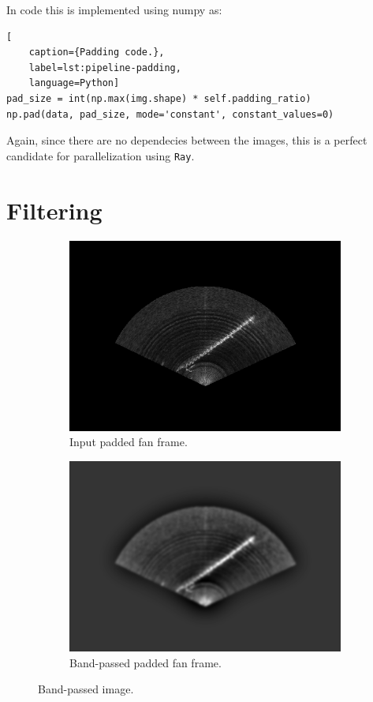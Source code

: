 In code this is implemented using numpy as:
\begin{lstlisting}[
    caption={Padding code.},
    label=lst:pipeline-padding,
    language=Python]
pad_size = int(np.max(img.shape) * self.padding_ratio)
np.pad(data, pad_size, mode='constant', constant_values=0)
\end{lstlisting}

Again, since there are no dependecies between the images, this is a perfect candidate for parallelization using \texttt{Ray}.

\section{Filtering}

\begin{figure}[H]
    \centering
    \begin{subfigure}[b]{.45\textwidth}
        \centering
        \includegraphics[width=\textwidth]{figures/pipeline/Padding.png}
        \caption{Input padded fan frame.}
    \end{subfigure}
    \hfill
    \begin{subfigure}[b]{.45\textwidth}
        \centering
        \includegraphics[width=\textwidth]{figures/pipeline/Bandpass.png}
        \caption{Band-passed padded fan frame.}
    \end{subfigure}
    \caption{Band-passed image.}
\end{figure}

